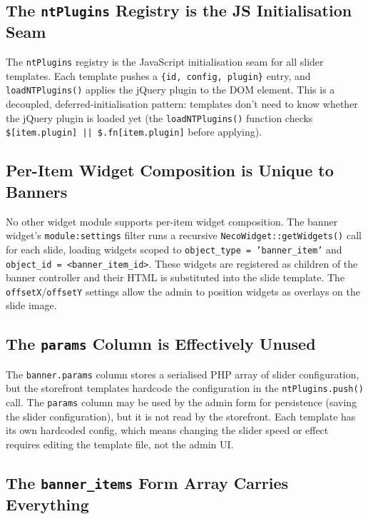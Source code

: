 \documentclass[11pt,a4paper]{article}
\begin{document}
\subsection{The \texttt{ntPlugins} Registry is the JS Initialisation Seam}

The \texttt{ntPlugins} registry is the JavaScript initialisation seam
for all slider templates. Each template pushes a
\texttt{\{id, config, plugin\}} entry, and
\texttt{loadNTPlugins()} applies the jQuery plugin to the DOM element.
This is a decoupled, deferred-initialisation pattern: templates don't
need to know whether the jQuery plugin is loaded yet (the
\texttt{loadNTPlugins()} function checks
\texttt{\$[item.plugin] || \$.fn[item.plugin]} before applying).

\subsection{Per-Item Widget Composition is Unique to Banners}

No other widget module supports per-item widget composition. The
banner widget's \texttt{module:settings} filter runs a recursive
\texttt{NecoWidget::getWidgets()} call for each slide, loading
widgets scoped to \texttt{object\_type = 'banner\_item'} and
\texttt{object\_id = <banner\_item\_id>}. These widgets are registered
as children of the banner controller and their HTML is substituted
into the slide template. The \texttt{offsetX}/\texttt{offsetY}
settings allow the admin to position widgets as overlays on the
slide image.

\subsection{The \texttt{params} Column is Effectively Unused}

The \texttt{banner.params} column stores a serialised PHP array of
slider configuration, but the storefront templates hardcode the
configuration in the \texttt{ntPlugins.push()} call. The
\texttt{params} column may be used by the admin form for persistence
(saving the slider configuration), but it is not read by the
storefront. Each template has its own hardcoded config, which means
changing the slider speed or effect requires editing the template
file, not the admin UI.

\subsection{The \texttt{banner\_items} Form Array Carries Everything}
\end{document}
